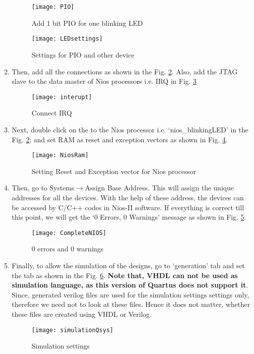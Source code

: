 \begin{enumerate}
	\begin{figure}[!h]
		\centering
		\texttt{[image: PIO]}
		\caption{Add 1 bit PIO for one blinking LED}
		\label{fig:PIO}
	\end{figure}
	
	\begin{figure}[!h]
		\centering
		\texttt{[image: LEDsettings]}
		\caption{Settings for PIO and other device}
		\label{fig:LEDsettings}
	\end{figure}
	
	\item Then, add all the connections as shown in the Fig. \ref{fig:LEDsettings}. Also, add the JTAG slave to the data master of Nios processors i.e. IRQ in Fig. \ref{fig:interupt}
	
	\begin{figure}[!h]
		\centering
		\texttt{[image: interupt]}
		\caption{Connect IRQ}
		\label{fig:interupt}
	\end{figure}
	
	\item Next, double click on the to the Nios processor i.e. `nios\_blinkingLED' in the Fig. \ref{fig:LEDsettings}; and set RAM as reset and exception vectors as shown in Fig. \ref{fig:NiosRam}.
	\begin{figure}[!h]
		\centering
		\texttt{[image: NiosRam]}
		\caption{Setting Reset and Exception vector for Nios processor}
		\label{fig:NiosRam}
	\end{figure}
	
	
	\item Then, go to Systems$\rightarrow$Assign Base Address. This will assign the unique addresses for all the devices. With the help of these address, the devices can be accessed by C/C++ codes in Nios-II software. If everything is correct till this point, we will get the `0 Errors, 0 Warnings' message as shown in Fig. \ref{fig:CompleteNios}.
	\begin{figure}[!h]
		\centering
		\texttt{[image: CompleteNIOS]}
		\caption{0 errors and 0 warnings}
		\label{fig:CompleteNios}
	\end{figure}
	
	
	\item Finally, to allow the simulation of the designs, go to `generation' tab and set the tab as shown in the Fig. \ref{fig:simulationQsys}. \textbf{Note that, VHDL can not be used as simulation language, as this version of Quartus does not support it}. Since,  generated verilog files are used for the simulation settings settings only, therefore we need not to look at these files. Hence it does not matter, whether these files are created using VHDL or Verilog. 
	\begin{figure}[!h]
		\centering
		\texttt{[image: simulationQsys]}
		\caption{Simulation settings}
		\label{fig:simulationQsys}
	\end{figure}
	

\end{enumerate}
